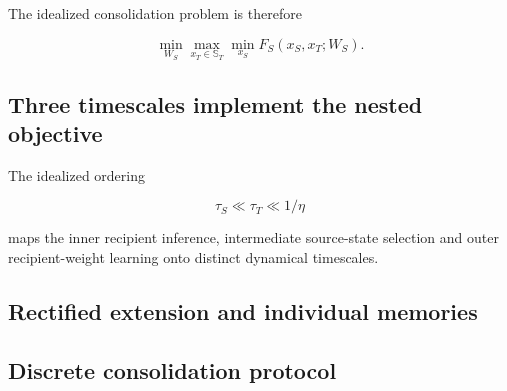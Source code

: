 \documentclass[10pt,letterpaper]{article}
\theoremstyle{plain}
\theoremstyle{remark}
\begin{document}
The idealized consolidation problem is therefore

\begin{equation}
\boxed{\min_{W_S}\max_{x_T\in\mathbb S_T}\min_{x_S}F_S(x_S,x_T;W_S).}
\label{eq:consolidation-objective}
\end{equation}


\subsection{Three timescales implement the nested objective}

The idealized ordering

\begin{equation}
\tau_S\ll\tau_T\ll1/\eta
\label{eq:timescales}
\end{equation}

maps the inner recipient inference, intermediate source-state selection and outer recipient-weight learning onto distinct dynamical timescales.


\subsection{Rectified extension and individual memories}


\subsection{Discrete consolidation protocol}

\end{document}
